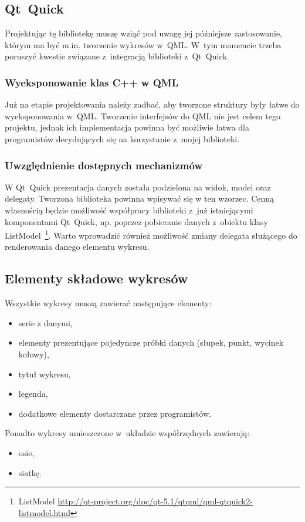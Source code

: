 \subsection{Qt~Quick}
Projektując tę bibliotekę muszę wziąć pod uwagę jej późniejsze zastosowanie, którym ma być m.in. tworzenie wykresów w~QML. W~tym momencie trzeba poruszyć kwestie związane z~integracją biblioteki z~Qt~Quick.
\subsubsection{Wyeksponowanie klas C++ w QML}
Już na etapie projektowania należy zadbać, aby tworzone struktury były łatwe do wyeksponowania w~QML. 
Tworzenie interfejsów do QML nie jest celem tego projektu, jednak ich implementacja powinna być możliwie łatwa dla programistów decydujących się na korzystanie z~mojej biblioteki.

\subsubsection{Uwzględnienie dostępnych mechanizmów}
W Qt~Quick prezentacja danych została podzielona na widok, model oraz delegaty. Tworzona biblioteka powinna wpisywać się w ten wzorzec. Cenną własnością będzie możliwość współpracy biblioteki z~już istniejącymi komponentami Qt~Quick, np. poprzez pobieranie danych z~obiektu klasy ListModel~\footnote{ListModel \url{http://qt-project.org/doc/qt-5.1/qtqml/qml-qtquick2-listmodel.html}}. Warto wprowadzić również możliwość zmiany delegata służącego do renderowania danego elementu wykresu.




\subsection{Elementy składowe wykresów}
Wszystkie wykresy muszą zawierać następujące elementy:
\begin{itemize}
\item{serie z danymi,}
\item{elementy prezentujące pojedyncze próbki danych (słupek, punkt, wycinek kołowy),}
\item{tytuł wykresu,}
\item{legenda,}
\item{dodatkowe elementy dostarczane przez programistów.}
\end{itemize}

Ponadto wykresy umieszczone w~układzie współrzędnych zawierają:
\begin{itemize}
\item{osie,} %
\item{siatkę.}
\end{itemize}

